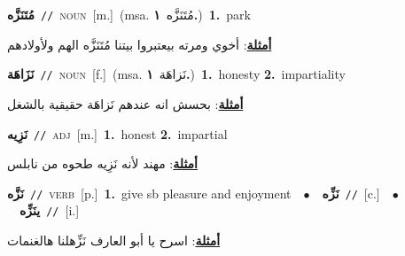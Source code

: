 \documentclass[10pt,a4paper,twoside]{article} %
\begin{document}
\begin{multicols}{2}
{\setlength\topsep{0pt}\textbf{\foreignlanguage{arabic}{مُتَنَزَّه}}\ {\color{gray}\texttt{//}\color{black}}\ \textsc{noun}\ [m.]\ \color{gray}(msa. \foreignlanguage{arabic}{مُتَنَزَّه}~\foreignlanguage{arabic}{\textbf{١.}})\color{black}\ \textbf{1.}~park\  \begin{flushright}\color{gray}\foreignlanguage{arabic}{\textbf{\underline{\foreignlanguage{arabic}{أمثلة}}}: أخوي ومرته بيعتبروا بيتنا مُتَنَزَّه الهم ولأولادهم}\end{flushright}\color{black}} \vspace{2mm}

{\setlength\topsep{0pt}\textbf{\foreignlanguage{arabic}{نَزَاهَة}}\ {\color{gray}\texttt{//}\color{black}}\ \textsc{noun}\ [f.]\ \color{gray}(msa. \foreignlanguage{arabic}{نَزاهَة}~\foreignlanguage{arabic}{\textbf{١.}})\color{black}\ \textbf{1.}~honesty  \textbf{2.}~impartiality\  \begin{flushright}\color{gray}\foreignlanguage{arabic}{\textbf{\underline{\foreignlanguage{arabic}{أمثلة}}}: بحسش انه عندهم نَزاهَة حقيقية بالشغل}\end{flushright}\color{black}} \vspace{2mm}

{\setlength\topsep{0pt}\textbf{\foreignlanguage{arabic}{نَزِيه}}\ {\color{gray}\texttt{//}\color{black}}\ \textsc{adj}\ [m.]\ \textbf{1.}~honest  \textbf{2.}~impartial\  \begin{flushright}\color{gray}\foreignlanguage{arabic}{\textbf{\underline{\foreignlanguage{arabic}{أمثلة}}}: مهند لأنه نَزِيه طحوه من نابلس}\end{flushright}\color{black}} \vspace{2mm}

{\setlength\topsep{0pt}\textbf{\foreignlanguage{arabic}{نَزَّه}}\ {\color{gray}\texttt{//}\color{black}}\ \textsc{verb}\ [p.]\ \textbf{1.}~give sb pleasure and enjoyment\ \ $\bullet$\ \ \setlength\topsep{0pt}\textbf{\foreignlanguage{arabic}{نَزِّه}}\ {\color{gray}\texttt{//}\color{black}}\ [c.]\ \ $\bullet$\ \ \setlength\topsep{0pt}\textbf{\foreignlanguage{arabic}{ينَزِّه}}\ {\color{gray}\texttt{//}\color{black}}\ [i.]\  \begin{flushright}\color{gray}\foreignlanguage{arabic}{\textbf{\underline{\foreignlanguage{arabic}{أمثلة}}}: اسرح يا أبو العارف نَزِّهلنا هالغنمات}\end{flushright}\color{black}} \vspace{2mm}


\end{multicols}
\end{document}
